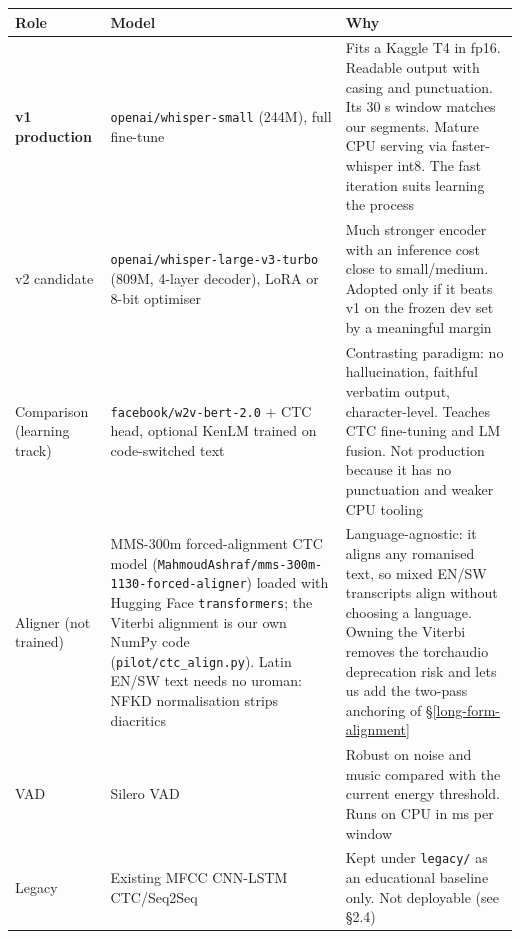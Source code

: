 \documentclass[11pt]{article}
\begin{document}
\begin{longtable}[]{@{}>{\raggedright\arraybackslash}p{}>{\raggedright\arraybackslash}p{}>{\raggedright\arraybackslash}p{}@{}}
\toprule\noalign{}
Role & Model & Why \\
\midrule\noalign{}
\endhead
\bottomrule\noalign{}
\endlastfoot
\textbf{v1 production} & \texttt{openai/\allowbreak{}whisper-\allowbreak{}small} (244M), full fine-tune & Fits a Kaggle T4 in fp16. Readable output with casing and punctuation. Its 30 s window matches our segments. Mature CPU serving via faster-whisper int8. The fast iteration suits learning the process \\
v2 candidate & \texttt{openai/\allowbreak{}whisper-\allowbreak{}large-\allowbreak{}v3-\allowbreak{}turbo} (809M, 4-layer decoder), LoRA or 8-bit optimiser & Much stronger encoder with an inference cost close to small/medium. Adopted only if it beats v1 on the frozen dev set by a meaningful margin \\
Comparison (learning track) & \texttt{facebook/\allowbreak{}w2v-\allowbreak{}bert-\allowbreak{}2.\allowbreak{}0} + CTC head, optional KenLM trained on code-switched text & Contrasting paradigm: no hallucination, faithful verbatim output, character-level. Teaches CTC fine-tuning and LM fusion. Not production because it has no punctuation and weaker CPU tooling \\
Aligner (not trained) & MMS-300m forced-alignment CTC model (\texttt{MahmoudAshraf/\allowbreak{}mms-\allowbreak{}300m-\allowbreak{}1130-\allowbreak{}forced-\allowbreak{}aligner}) loaded with Hugging Face \texttt{transformers}; the Viterbi alignment is our own NumPy code (\texttt{pilot/\allowbreak{}ctc\_\allowbreak{}align.\allowbreak{}py}). Latin EN/SW text needs no uroman: NFKD normalisation strips diacritics & Language-agnostic: it aligns any romanised text, so mixed EN/SW transcripts align without choosing a language. Owning the Viterbi removes the torchaudio deprecation risk and lets us add the two-pass anchoring of §\ref{long-form-alignment} \\
VAD & Silero VAD & Robust on noise and music compared with the current energy threshold. Runs on CPU in ms per window \\
Legacy & Existing MFCC CNN-LSTM CTC/Seq2Seq & Kept under \texttt{legacy/\allowbreak{}} as an educational baseline only. Not deployable (see §2.4) \\
\end{longtable}
\end{document}
